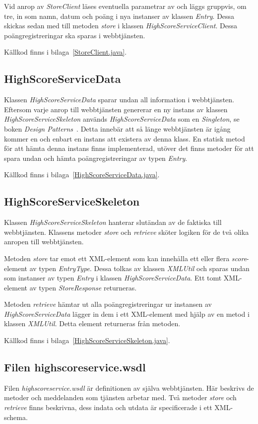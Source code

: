 \documentclass[a4paper, 12pt]{article}
\begin{document}
Vid anrop av \textit{StoreClient} läses eventuella parametrar av och
läggs gruppvis, om tre, in som namn, datum och poäng i nya instanser av
klassen \textit{Entry}. Dessa skickas sedan med till metoden
\textit{store} i klassen \textit{HighScoreServiceClient}. Dessa
poängregistreringar ska sparas i webbtjänsten.

Källkod finns i bilaga~\ref{StoreClient.java}.

\subsection{HighScoreServiceData}
Klassen \textit{HighScoreServiceData} sparar undan all information i
webbtjänsten. Eftersom varje anrop till webbtjänsten genererar en ny
instans av klassen \textit{HighScoreServiceSkeleton} används
\textit{HighScoreServiceData} som en \textit{Singleton}, se boken
\textit{Design Patterns}~\cite{gamma}. Detta innebär att så länge
webbtjänsten är igång kommer en och enbart en instans att existera av
denna klass. En statisk metod för att hämta denna instans finns
implementerad, utöver det finns metoder för att spara undan och hämta
poängregistreringar av typen \textit{Entry}.

Källkod finns i bilaga~\ref{HighScoreServiceData.java}.

\subsection{HighScoreServiceSkeleton}
Klassen \textit{HighScoreServiceSkeleton} hanterar slutändan av de
faktiska till webbtjänsten. Klassens metoder \textit{store} och
\textit{retrieve} sköter logiken för de två olika anropen till
webbtjänsten.

Metoden \textit{store} tar emot ett XML-element som kan innehålla ett
eller flera \textit{score}-element av typen \textit{EntryType}. Dessa
tolkas av klassen \textit{XMLUtil} och sparas undan som instanser av
typen \textit{Entry} i klassen \textit{HighScoreServiceData}. Ett tomt
XML-element av typen \textit{StoreResponse} returneras.

Metoden \textit{retrieve} hämtar ut alla poängregistreringar ur
instansen av \textit{HighScoreServiceData} lägger in dem i ett
XML-element med hjälp av en metod i klassen \textit{XMLUtil}. Detta
element returneras från metoden.

Källkod finns i bilaga~\ref{HighScoreServiceSkeleton.java}.

\subsection{Filen highscoreservice.wsdl}\label{sec:highscoreservice.wsdl}
Filen \textit{highscoreservice.wsdl} är definitionen av själva
webbtjänsten. Här beskrivs de metoder och meddelanden som tjänsten
arbetar med. Två metoder \textit{store} och \textit{retrieve} finns
beskrivna, dess indata och utdata är specificerade i ett
XML-schema.
\end{document}

